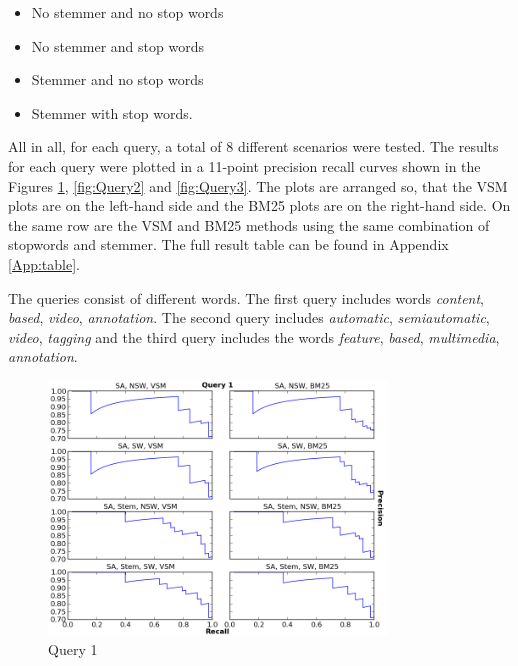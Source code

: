 \begin{itemize}
\item No stemmer and no stop words
\item No stemmer and stop words 
\item Stemmer and no stop words
\item Stemmer with stop words.
\end{itemize}

All in all, for each query, a total of 8 different scenarios were tested. The results for each query were plotted in a 11-point precision recall curves shown in the Figures \ref{fig:Query1}, \ref{fig:Query2} and \ref{fig:Query3}. The plots are arranged so, that the VSM plots are on the left-hand side and the BM25 plots are on the right-hand side. On the same row are the VSM and BM25 methods using the same combination of stopwords and stemmer. The full result table can be found in Appendix \ref{App:table}. 

The queries consist of different words. The first query includes words \textit{content}, \textit{based}, \textit{video}, \textit{annotation}. The second query includes  \textit{automatic}, \textit{semiautomatic}, \textit{video}, \textit{tagging} and the third query includes the words \textit{feature}, \textit{based}, \textit{multimedia}, \textit{annotation}. 


\begin{figure}[ht]
  \centering
  \includegraphics[width=0.8\textwidth]{Query1.png}
  \caption{Query 1 }
  \label{fig:Query1}
\end{figure}
\FloatBarrier


